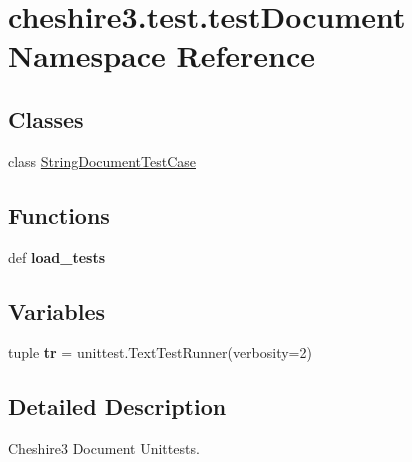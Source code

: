 \hypertarget{namespacecheshire3_1_1test_1_1test_document}{\section{cheshire3.\-test.\-test\-Document Namespace Reference}
\label{namespacecheshire3_1_1test_1_1test_document}
}
\subsection*{Classes}
\begin{DoxyCompactItemize}
\item 
class \hyperlink{classcheshire3_1_1test_1_1test_document_1_1_string_document_test_case}{String\-Document\-Test\-Case}
\end{DoxyCompactItemize}
\subsection*{Functions}
\begin{DoxyCompactItemize}
\item 
\hypertarget{namespacecheshire3_1_1test_1_1test_document_a4129ff9fa922953b1ee130021567a199}{def {\bfseries load\-\_\-tests}}\label{namespacecheshire3_1_1test_1_1test_document_a4129ff9fa922953b1ee130021567a199}

\end{DoxyCompactItemize}
\subsection*{Variables}
\begin{DoxyCompactItemize}
\item 
\hypertarget{namespacecheshire3_1_1test_1_1test_document_a406b227041c13a24dd1c90aa126062e2}{tuple {\bfseries tr} = unittest.\-Text\-Test\-Runner(verbosity=2)}\label{namespacecheshire3_1_1test_1_1test_document_a406b227041c13a24dd1c90aa126062e2}

\end{DoxyCompactItemize}


\subsection{Detailed Description}
\begin{DoxyVerb}Cheshire3 Document Unittests.\end{DoxyVerb}
 
